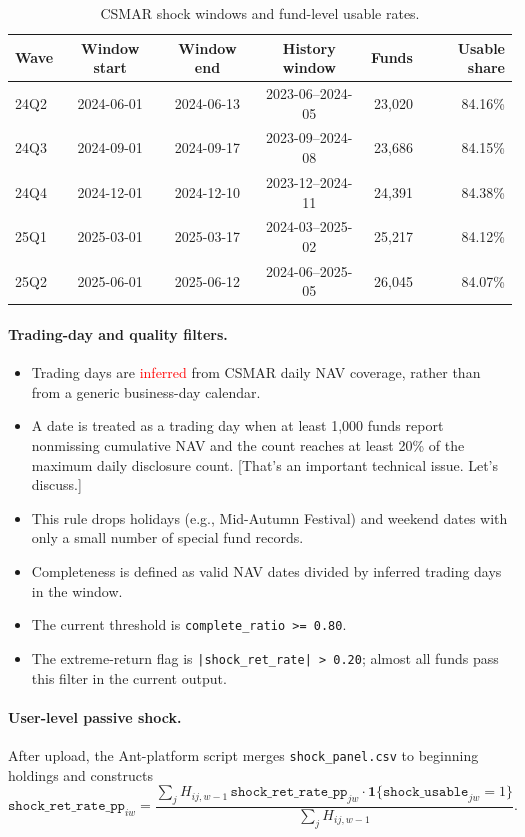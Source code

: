 \documentclass[11pt,letterpaper,english,final]{article}
\begin{document}
\begin{table}[H]
\centering
\small
\setlength{\tabcolsep}{5pt}
\caption{CSMAR shock windows and fund-level usable rates.}
\label{tab:csmar_shock_windows_20260901}
\begin{tabular}{lcccrr}
\toprule
Wave & Window start & Window end & History window & Funds & Usable share \\
\midrule
24Q2 & 2024-06-01 & 2024-06-13 & 2023-06--2024-05 & 23{,}020 & 84.16\% \\
24Q3 & 2024-09-01 & 2024-09-17 & 2023-09--2024-08 & 23{,}686 & 84.15\% \\
24Q4 & 2024-12-01 & 2024-12-10 & 2023-12--2024-11 & 24{,}391 & 84.38\% \\
25Q1 & 2025-03-01 & 2025-03-17 & 2024-03--2025-02 & 25{,}217 & 84.12\% \\
25Q2 & 2025-06-01 & 2025-06-12 & 2024-06--2025-05 & 26{,}045 & 84.07\% \\
\bottomrule
\end{tabular}
\end{table}

\paragraph{Trading-day and quality filters.}
\begin{itemize}
\item Trading days are \textcolor{red}{inferred} from CSMAR daily NAV coverage, rather than from a generic business-day calendar.
\item A date is treated as a trading day when at least 1{,}000 funds report nonmissing cumulative NAV and the count reaches at least 20\% of the maximum daily disclosure count. {\color{cyan}[That's an important technical issue. Let's discuss.]}
\item This rule drops holidays (e.g., Mid-Autumn Festival) and weekend dates with only a small number of special fund records.
\item Completeness is defined as valid NAV dates divided by inferred trading days in the window.
\item The current threshold is \texttt{complete\_ratio >= 0.80}.
\item The extreme-return flag is \texttt{|shock\_ret\_rate| > 0.20}; almost all funds pass this filter in the current output.
\end{itemize}

\paragraph{User-level passive shock.}
After upload, the Ant-platform script merges \texttt{shock\_panel.csv} to beginning holdings and constructs
\[
\texttt{shock\_ret\_rate\_pp}_{iw}
=
\frac{\sum_j H_{ij,w-1}\,\texttt{shock\_ret\_rate\_pp}_{jw}
      \cdot \mathbf{1}\{\texttt{shock\_usable}_{jw}=1\}}
     {\sum_j H_{ij,w-1}}.
\]
\end{document}
